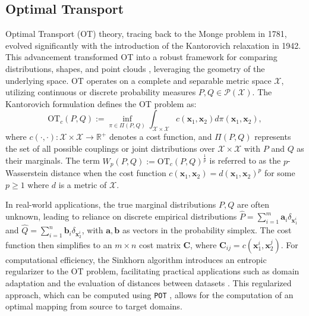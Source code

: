 \documentclass[11pt,a4paper]{article}
\begin{document}
\subsection{Optimal Transport}
\label{sec:ot}
Optimal Transport (OT) theory, tracing back to the Monge problem in 1781, evolved significantly with the introduction of the Kantorovich relaxation \cite{kantorovich1942translocation} in 1942. 
This advancement transformed OT into a robust framework for comparing distributions, shapes, and point clouds \cite{peyre2019computational}, leveraging the geometry of the underlying space. 
OT operates on a complete and separable metric space $\mathcal{X}$, utilizing continuous or discrete probability measures $P, Q \in \mathcal{P(X)}$. 
The Kantorovich formulation defines the OT problem as:
\begin{equation}
\mathrm{OT}_c(P, Q) := \mathop{\inf}\limits_{\pi \in \Pi(P, Q)} \int_{\mathcal{X} \times \mathcal{X}} c(\mathbf{x}_1, \mathbf{x}_2)d\pi (\mathbf{x}_1, \mathbf{x}_2),
\end{equation}
where $c(\cdot,\cdot): \mathcal{X}\times\mathcal{X} \rightarrow \mathbb{R^+}$ denotes a cost function, and $\Pi(P, Q)$ represents the set of all possible couplings or joint distributions over $\mathcal{X}\times\mathcal{X}$ with $P$ and $Q$ as their marginals. 
The term $W_p(P,Q) := \mathrm{OT}_c(P, Q)^{\frac{1}{p} }$ is referred to as the $p$-Wasserstein distance when the cost function $c(\mathbf{x}_1, \mathbf{x}_2)=d(\mathbf{x}_1, \mathbf{x}_2)^p$ for some $p\geq1$ where $d$ is a metric of $\mathcal{X}$.

In real-world applications, the true marginal distributions $P, Q$ are often unknown, leading to reliance on discrete empirical distributions $\hat{P}=\sum_{i=1}^{m}\mathbf{a}_i\delta_{\mathbf{x}_1^i}$ and $\hat{Q}=\sum_{i=1}^{n}\mathbf{b}_i\delta_{\mathbf{x}_2^i}$, with $\mathbf{a},\mathbf{b}$ as vectors in the probability simplex. 
The cost function then simplifies to an $m \times n$ cost matrix $\mathbf{C}$, where $\mathbf{C}_{ij} = c(\mathbf{x}_1^i, \mathbf{x}_2^j)$. 
For computational efficiency, the Sinkhorn algorithm \cite{cuturi2013sinkhorn} introduces an entropic regularizer to the OT problem, facilitating practical applications such as domain adaptation \cite{courty2016optimal} and the evaluation of distances between datasets \cite{alvarez2020geometric}. 
This regularized approach, which can be computed using \verb|POT| \cite{flamary2021pot}, allows for the computation of an optimal mapping from source to target domains.
\end{document}
